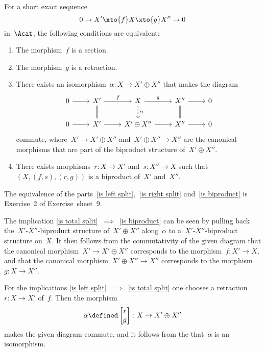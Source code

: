 \begin{lemma*}
  \label{characterizations of split ses}
  For a short exact sequence
  \[
    0
    \to
    X'
    \xto{f}
    X
    \xto{g}
    X''
    \to
    0
  \]
  in~$\Acat$, the following conditions are equivalent:
  \begin{enumerate}
    \item
      \label{is left split}
      The morphism~$f$ is a section.
    \item
      \label{is right split}
      The morphism~$g$ is a retraction.
    \item
      \label{is total split}
      There exists an isomorphism~$\alpha \colon X \to X' \oplus X''$ that makes the diagram
      \[
        \begin{tikzcd}
            0
            \arrow{r}
          & X'
            \arrow{r}[above]{f}
            \arrow[equal]{d}
          & X
            \arrow{r}[above]{g}
            \arrow[dashed]{d}[right]{\alpha}
          & X''
            \arrow{r}
            \arrow[equal]{d}
          & 0
          \\
            0
            \arrow{r}
          & X'
            \arrow{r}
          & X' \oplus X''
            \arrow{r}
          & X''
            \arrow{r}
          & 0
        \end{tikzcd}
      \]
      commute, where~$X' \to X' \oplus X''$ and~$X' \oplus X'' \to X''$ are the canonical morphisms that are part of the biproduct structure of~$X' \oplus X''$.
    \item
      \label{is biproduct}
      There exists morphisms~$r \colon X \to X'$ and~$s \colon X'' \to X$ such that~$(X, (f,s), (r,g))$ is a biproduct of~$X'$ and~$X''$.
  \end{enumerate}
\end{lemma*}


\begin{proof*}
  The equivalence of the parts~\ref*{is left split},~\ref*{is right split} and~\ref*{is biproduct} is Exercise~2 of Exercise~sheet~9.
  
  The implication \ref*{is total split}~$\implies$~\ref*{is biproduct} can be seen by pulling back the~$X'$\nobreakdash-$X''$\nobreakdash-biproduct structure of~$X' \oplus X''$ along~$\alpha$ to a~$X'$\nobreakdash-$X''$\nobreakdash-biproduct structure on~$X$.
  It then follows from the commutativity of the given diagram that the canonical morphism~$X' \to X' \oplus X''$ corresponds to the morphism~$f \colon X' \to X$, and that the canonical morphism~$X' \oplus X'' \to X''$ corresponds to the morphism~$g \colon X \to X''$.
  
  For the implications \ref*{is left split}~$\implies$~\ref*{is total split} one chooses a retraction~$r \colon X \to X'$ of~$f$.
  Then the morphism
  \[
    \alpha
    \defined
    \begin{bmatrix}
      r \\
      g
    \end{bmatrix}
    \colon
    X
    \to
    X' \oplus X''
  \]
  makes the given diagram commute, and it follows from the \hyperref[5 lemma]{} that~$\alpha$ is an isomorphism.
\end{proof*}


